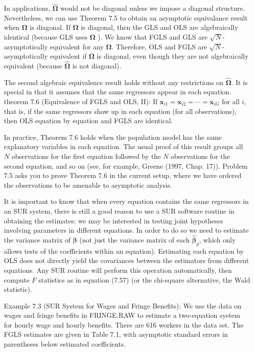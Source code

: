 \documentclass[10pt]{article}
\begin{document}
In applications, $\hat{\boldsymbol{\Omega}}$ would not be diagonal unless we impose a diagonal structure. Nevertheless, we can use Theorem 7.5 to obtain an asymptotic equivalance result when $\boldsymbol{\Omega}$ is diagonal. If $\boldsymbol{\Omega}$ is diagonal, then the GLS and OLS are algebraically identical (because GLS uses $\boldsymbol{\Omega}$ ). We know that FGLS and GLS are $\sqrt{N}$-asymptotically equivalent for any $\boldsymbol{\Omega}$. Therefore, OLS and FGLS are $\sqrt{N}$-asymptotically equivalent if $\boldsymbol{\Omega}$ is diagonal, even though they are not algebraically equivalent (because $\hat{\boldsymbol{\Omega}}$ is not diagonal).

The second algebraic equivalence result holds without any restrictions on $\hat{\boldsymbol{\Omega}}$. It is special in that it assumes that the same regressors appear in each equation.\\
theorem 7.6 (Equivalence of FGLS and OLS, II): If $\mathbf{x}_{i 1}=\mathbf{x}_{i 2}=\cdots=\mathbf{x}_{i G}$ for all $i$, that is, if the same regressors show up in each equation (for all observations), then OLS equation by equation and FGLS are identical.

In practice, Theorem 7.6 holds when the population model has the same explanatory variables in each equation. The usual proof of this result groups all $N$ observations for the first equation followed by the $N$ observations for the second equation, and so on (see, for example, Greene (1997, Chap. 17)). Problem 7.5 asks you to prove Theorem 7.6 in the current setup, where we have ordered the observations to be amenable to asymptotic analysis.

It is important to know that when every equation contains the same regressors in an SUR system, there is still a good reason to use a SUR software routine in obtaining the estimates: we may be interested in testing joint hypotheses involving parameters in different equations. In order to do so we need to estimate the variance matrix of $\hat{\boldsymbol{\beta}}$ (not just the variance matrix of each $\hat{\boldsymbol{\beta}}_{g}$, which only allows tests of the coefficients within an equation). Estimating each equation by OLS does not directly yield the covariances between the estimators from different equations. Any SUR routine will perform this operation automatically, then compute $F$ statistics as in equation (7.57) (or the chi-square alternative, the Wald statistic).

Example 7.3 (SUR System for Wages and Fringe Benefits): We use the data on wages and fringe benefits in FRINGE.RAW to estimate a two-equation system for hourly wage and hourly benefits. There are 616 workers in the data set. The FGLS estimates are given in Table 7.1, with asymptotic standard errors in parentheses below estimated coefficients.
\end{document}
